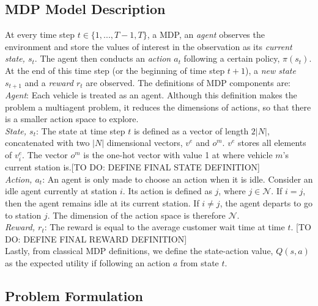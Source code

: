 \documentclass[letterpaper, 10 pt, conference]{ieeeconf}  %
\begin{document}
\subsection{MDP Model Description}
At every time step $t \in \{1,...,T-1,T\}$, a MDP, an \textit{agent} observes the environment and store the values of interest in the observation as its \textit{current state, $s_t$}. The agent then conducts an \textit{action $a_t$} following a certain policy, $\pi(s_t)$. At the end of this time step (or the beginning of time step $t+1$), a \textit{new state $s_{t+1}$} and a \textit{reward $r_t$} are observed. The definitions of MDP components are:\\

\noindent \textit{Agent}: Each vehicle is treated as an agent. Although this definition makes the problem a multiagent problem, it reduces the dimensions of actions, so that there is a smaller action space to explore. \\

\noindent \textit{State, $s_t$}: The state at time step $t$ is defined as a vector of length $2|N|$, concatenated with two $|N|$ dimensional vectors, $v^e$ and $o^m$. $v^e$ stores all elements of $v^e_i$. The vector $o^m$ is the one-hot vector with value 1 at where vehicle $m$'s current station is.[TO DO: DEFINE FINAL STATE DEFINITION] \\

\noindent \textit{Action, $a_t$}: An agent is only made to choose an action when it is idle. Consider an idle agent currently at station $i$. Its action is defined as $j$, where $j\in \mathcal{N}$. If $i = j$, then the agent remains idle at its current station. If $i \neq j$, the agent departs to go to station $j$. The dimension of the action space is therefore $\mathcal{N}$. \\

\noindent \textit{Reward, $r_t$}: The reward is equal to the average customer wait time at time $t$. [TO DO: DEFINE FINAL REWARD DEFINITION] \\ 

Lastly, from classical MDP definitions, we define the state-action value, $Q(s,a)$ as the expected utility if following an action $a$ from state $t$.

\subsection{Problem Formulation}
\end{document}

